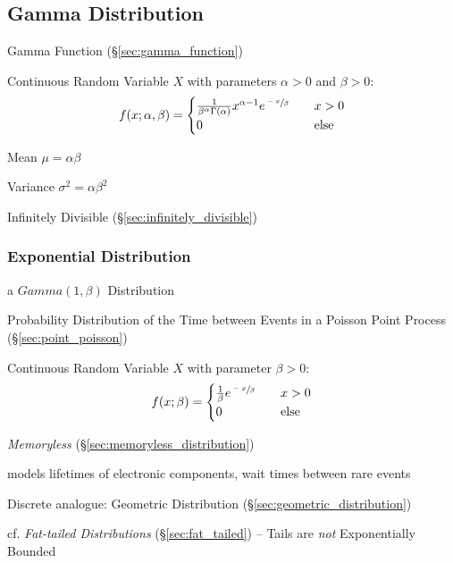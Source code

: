 \subsection{Gamma Distribution}\label{sec:gamma_distribution}

Gamma Function (\S\ref{sec:gamma_function})

Continuous Random Variable $X$ with parameters $\alpha > 0$ and $\beta
> 0$:
\[
  f(x; \alpha, \beta) =
  \begin{cases}
    \frac{1}{\beta^\alpha \Gamma(\alpha)} x^{\alpha-1} e^{\sfrac{-x}{\beta}}
      & \quad x > 0 \\
    0 & \quad\text{else} \\
  \end{cases}
\]

Mean $\mu = \alpha \beta$

Variance $\sigma^2 = \alpha \beta^2$

Infinitely Divisible (\S\ref{sec:infinitely_divisible})



\subsubsection{Exponential Distribution}\label{sec:exponential_distribution}

a $Gamma(1, \beta)$ Distribution

Probability Distribution of the Time between Events in a Poisson Point Process
(\S\ref{sec:point_poisson})

Continuous Random Variable $X$ with parameter $\beta > 0$:
\[
  f(x; \beta) =
  \begin{cases}
  \frac{1}{\beta} e^{\sfrac{-x}{\beta}}     & \quad x > 0 \\
  0     & \quad\text{else} \\
  \end{cases}
\]

\emph{Memoryless} (\S\ref{sec:memoryless_distribution})

models lifetimes of electronic components, wait times between rare events

\fist Discrete analogue: Geometric Distribution
(\S\ref{sec:geometric_distribution})

cf. \emph{Fat-tailed Distributions} (\S\ref{sec:fat_tailed}) -- Tails are
\emph{not} Exponentially Bounded



